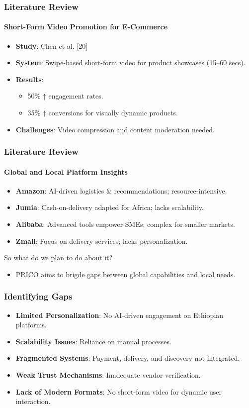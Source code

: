\documentclass{beamer}
\begin{document}
\begin{frame}
	\frametitle{Literature Review}
	\framesubtitle{Short-Form Video Promotion for E-Commerce}
	\begin{itemize}
		\item \textbf{Study}: Chen et al. [20]
		\item \textbf{System}: Swipe-based short-form video for product showcases (15–60 secs).
		\item \textbf{Results}:
		      \begin{itemize}
			      \item 50\% ↑ engagement rates.
			      \item 35\% ↑ conversions for visually dynamic products.
		      \end{itemize}
		\item \textbf{Challenges}: Video compression and content moderation needed.
	\end{itemize}
\end{frame}

\begin{frame}
	\frametitle{Literature Review}
	\framesubtitle{Global and Local Platform Insights}
	\begin{itemize}
		\item \textbf{Amazon}: AI-driven logistics \& recommendations; resource-intensive.
		\item \textbf{Jumia}: Cash-on-delivery adapted for Africa; lacks scalability.
		\item \textbf{Alibaba}: Advanced tools empower SMEs; complex for smaller markets.
		\item \textbf{Zmall}: Focus on delivery services; lacks personalization.
	\end{itemize}
	So what do we plan to do about it?
	\begin{itemize}
		\item PRICO aims to brigde gaps between global capabilities and local needs.
	\end{itemize}
\end{frame}

\begin{frame}
	\frametitle{Identifying Gaps}
	\begin{itemize}
		\item \textbf{Limited Personalization}: No AI-driven engagement on Ethiopian platforms.
		\item \textbf{Scalability Issues}: Reliance on manual processes.
		\item \textbf{Fragmented Systems}: Payment, delivery, and discovery not integrated.
		\item \textbf{Weak Trust Mechanisms}: Inadequate vendor verification.
		\item \textbf{Lack of Modern Formats}: No short-form video for dynamic user interaction.
	\end{itemize}
\end{frame}
\end{document}
